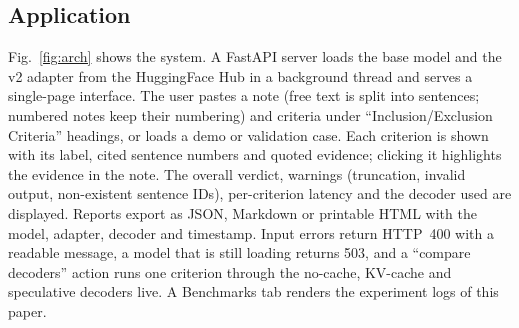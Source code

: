 \documentclass[conference]{IEEEtran}
\begin{document}
\subsection{Application}
Fig.~\ref{fig:arch} shows the system. A FastAPI server loads the base model and the v2 adapter from the HuggingFace Hub in a background thread and serves a single-page interface. The user pastes a note (free text is split into sentences; numbered notes keep their numbering) and criteria under ``Inclusion/Exclusion Criteria'' headings, or loads a demo or validation case. Each criterion is shown with its label, cited sentence numbers and quoted evidence; clicking it highlights the evidence in the note. The overall verdict, warnings (truncation, invalid output, non-existent sentence IDs), per-criterion latency and the decoder used are displayed. Reports export as JSON, Markdown or printable HTML with the model, adapter, decoder and timestamp. Input errors return HTTP~400 with a readable message, a model that is still loading returns 503, and a ``compare decoders'' action runs one criterion through the no-cache, KV-cache and speculative decoders live. A Benchmarks tab renders the experiment logs of this paper.
\end{document}
